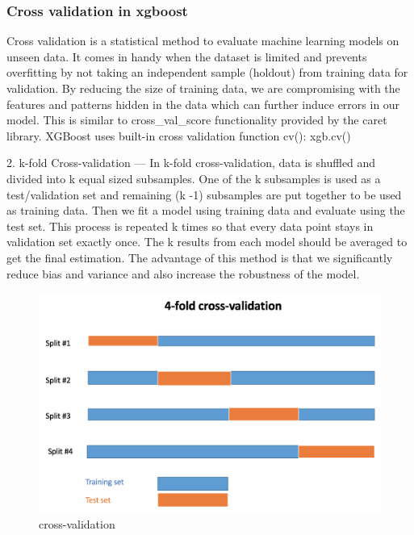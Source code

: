 \subsubsection{Cross validation in xgboost}
Cross validation is a statistical method to evaluate machine learning models on unseen data. It comes in handy when the dataset is limited and prevents overfitting by not taking an independent sample (holdout) from training data for validation. By reducing the size of training data, we are compromising with the features and patterns hidden in the data which can further induce errors in our model. This is similar to cross\_val\_score functionality provided by the caret library. XGBoost uses built-in cross validation function cv():
xgb.cv()\par
2. k-fold Cross-validation — In k-fold cross-validation, data is shuffled and divided into k equal sized subsamples. One of the k subsamples is used as a test/validation set and remaining (k -1) subsamples are put together to be used as training data. Then we fit a model using training data and evaluate using the test set. This process is repeated k times so that every data point stays in validation set exactly once. The k results from each model should be averaged to get the final estimation. The advantage of this method is that we significantly reduce bias and variance and also increase the robustness of the model. 
\begin{figure}[h]
\label{bd}
\centering
\includegraphics[width= 14 cm]{xgb_kfold.png}
\caption{cross-validation}
\end{figure}
